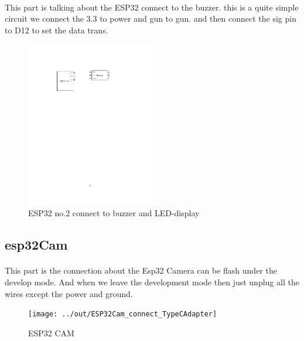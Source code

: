 \documentclass[12pt, a4, utf8]{report}        %
\begin{document}
    \paragraph{}
    This part is talking about the ESP32 connect to the buzzer.
    this is a quite simple circuit we connect the 3.3 to power and gun to gun.
    and then connect the sig pin to D12 to set the data trans.

    \blindtext{}



    \begin{figure}[h]
        \caption{ESP32 no.2 connect to buzzer and LED-display}\label{fig:figure3}
        \centering
        \includegraphics[width=0.5\textwidth]{../out/ESP32_No.2_connect_Buzzer}
    \end{figure}

    \subsection{esp32Cam }\label{subsec:esp32cam}
    \paragraph{}
    This part is the connection about the Esp32 Camera can be flash under the develop mode.
    And when we leave the development mode then just unplug all the wires except the power and ground.

    \blindtext{}



    \begin{figure}[h]
        \caption{ESP32 CAM}\label{fig:figure4}
        \centering
        \texttt{[image: ../out/ESP32Cam\_connect\_TypeCAdapter]}
    \end{figure}



    
    
\end{document}
